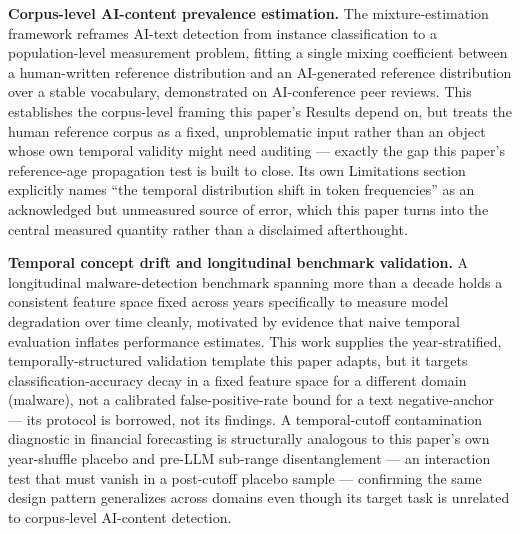\documentclass[conference]{IEEEtran}
\begin{document}
\textbf{Corpus-level AI-content prevalence estimation.} The mixture-estimation framework \cite{MonitorAIScale} reframes AI-text detection from instance classification to a population-level measurement problem, fitting a single mixing coefficient between a human-written reference distribution and an AI-generated reference distribution over a stable vocabulary, demonstrated on AI-conference peer reviews. This establishes the corpus-level framing this paper's Results depend on, but treats the human reference corpus as a fixed, unproblematic input rather than an object whose own temporal validity might need auditing --- exactly the gap this paper's reference-age propagation test is built to close. Its own Limitations section explicitly names ``the temporal distribution shift in token frequencies'' as an acknowledged but unmeasured source of error, which this paper turns into the central measured quantity rather than a disclaimed afterthought.

\textbf{Temporal concept drift and longitudinal benchmark validation.} A longitudinal malware-detection benchmark spanning more than a decade \cite{LAMDA} holds a consistent feature space fixed across years specifically to measure model degradation over time cleanly, motivated by evidence that naive temporal evaluation inflates performance estimates. This work supplies the year-stratified, temporally-structured validation template this paper adapts, but it targets classification-accuracy decay in a fixed feature space for a different domain (malware), not a calibrated false-positive-rate bound for a text negative-anchor --- its protocol is borrowed, not its findings. A temporal-cutoff contamination diagnostic in financial forecasting \cite{DetectingLookaheadBiasIn} is structurally analogous to this paper's own year-shuffle placebo and pre-LLM sub-range disentanglement --- an interaction test that must vanish in a post-cutoff placebo sample --- confirming the same design pattern generalizes across domains even though its target task is unrelated to corpus-level AI-content detection.
\end{document}
